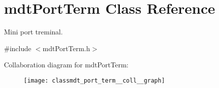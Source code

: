 \hypertarget{classmdt_port_term}{
\section{mdtPortTerm Class Reference}
\label{classmdt_port_term}
}


Mini port treminal.  




{\ttfamily \#include $<$mdtPortTerm.h$>$}



Collaboration diagram for mdtPortTerm:
\nopagebreak
\begin{figure}[H]
\begin{center}
\leavevmode
\texttt{[image: classmdt\_port\_term\_\_coll\_\_graph]}
\end{center}
\end{figure}
